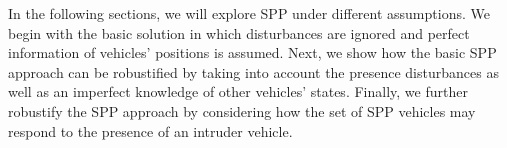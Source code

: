 In the following sections, we will explore SPP under different assumptions. We begin with the basic solution in which disturbances are ignored and perfect information of vehicles' positions is assumed. Next, we show how the basic SPP approach can be robustified by taking into account the presence disturbances as well as an imperfect knowledge of other vehicles' states. Finally, we further robustify the SPP approach by considering how the set of SPP vehicles may respond to the presence of an intruder vehicle. 